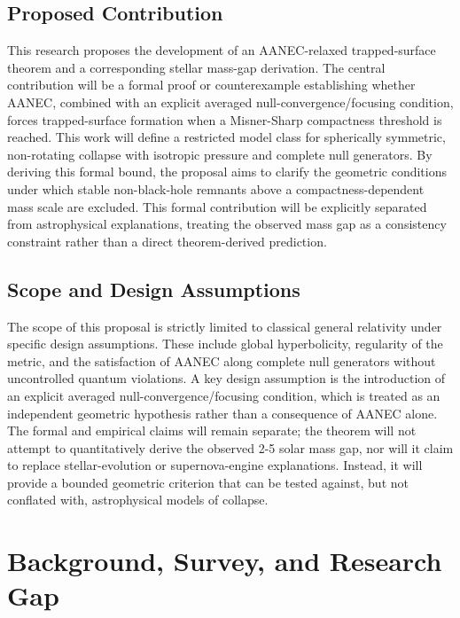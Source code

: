 \documentclass[conference]{IEEEtran}
\begin{document}
\subsection{Proposed Contribution}
This research proposes the development of an AANEC-relaxed trapped-surface theorem and a corresponding stellar mass-gap derivation. The central contribution will be a formal proof or counterexample establishing whether AANEC, combined with an explicit averaged null-convergence/focusing condition, forces trapped-surface formation when a Misner-Sharp compactness threshold is reached. This work will define a restricted model class for spherically symmetric, non-rotating collapse with isotropic pressure and complete null generators. By deriving this formal bound, the proposal aims to clarify the geometric conditions under which stable non-black-hole remnants above a compactness-dependent mass scale are excluded. This formal contribution will be explicitly separated from astrophysical explanations, treating the observed mass gap as a consistency constraint rather than a direct theorem-derived prediction.

\subsection{Scope and Design Assumptions}
The scope of this proposal is strictly limited to classical general relativity under specific design assumptions. These include global hyperbolicity, regularity of the metric, and the satisfaction of AANEC along complete null generators without uncontrolled quantum violations. A key design assumption is the introduction of an explicit averaged null-convergence/focusing condition, which is treated as an independent geometric hypothesis rather than a consequence of AANEC alone. The formal and empirical claims will remain separate; the theorem will not attempt to quantitatively derive the observed 2-5 solar mass gap, nor will it claim to replace stellar-evolution or supernova-engine explanations. Instead, it will provide a bounded geometric criterion that can be tested against, but not conflated with, astrophysical models of collapse.

\section{Background, Survey, and Research Gap}
\end{document}
